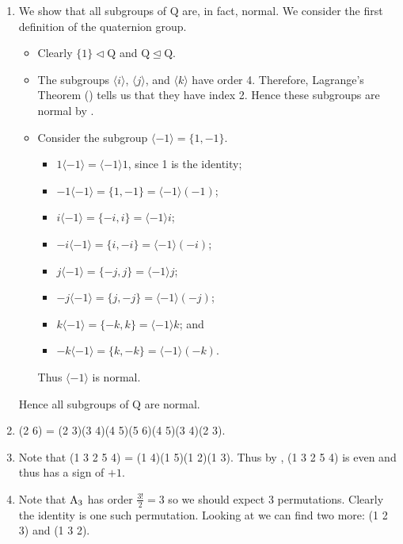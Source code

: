 \begin{enumerate}
    \item We show that all subgroups of $\mathrm{Q}$ are, in fact, normal. We consider the first definition of the quaternion group.
    \begin{itemize}
        \item Clearly $\{1\} \lhd \mathrm{Q}$ and $\mathrm{Q} \unlhd \mathrm{Q}$.
        \item The subgroups $\langle i\rangle$, $\langle j\rangle$, and $\langle k\rangle$ have order 4. Therefore, Lagrange's Theorem () tells us that they have index 2. Hence these subgroups are normal by .
        \item Consider the subgroup $\langle -1 \rangle = \{1, -1\}$. \begin{itemize}
            \item $1\langle -1 \rangle = \langle -1 \rangle1$, since 1 is the identity;
            \item $-1\langle -1 \rangle = \{1, -1\} = \langle -1 \rangle(-1)$;
            \item $i\langle -1 \rangle = \{-i, i\} = \langle -1 \rangle i$;
            \item $-i\langle -1 \rangle = \{i, -i\} = \langle -1 \rangle (-i)$;
            \item $j\langle -1 \rangle = \{-j, j\} = \langle -1 \rangle j$;
            \item $-j\langle -1 \rangle = \{j, -j\} = \langle -1 \rangle (-j)$;
            \item $k\langle -1 \rangle = \{-k, k\} = \langle -1 \rangle k$; and
            \item $-k\langle -1 \rangle = \{k, -k\} = \langle -1 \rangle (-k)$.
        \end{itemize}
        Thus $\langle -1 \rangle$ is normal.
    \end{itemize}
    Hence all subgroups of $\mathrm{Q}$ are normal.

    \item (2 6) = (2 3)(3 4)(4 5)(5 6)(4 5)(3 4)(2 3).

    \item Note that (1 3 2 5 4) = (1 4)(1 5)(1 2)(1 3). Thus by , (1 3 2 5 4) is even and thus has a sign of $+1$.

    \item Note that $\mathrm{A}_{3}$ has order $\frac{3!}{2} = 3$ so we should expect 3 permutations. Clearly the identity is one such permutation. Looking at  we can find two more: (1 2 3) and (1 3 2).


\end{enumerate}
